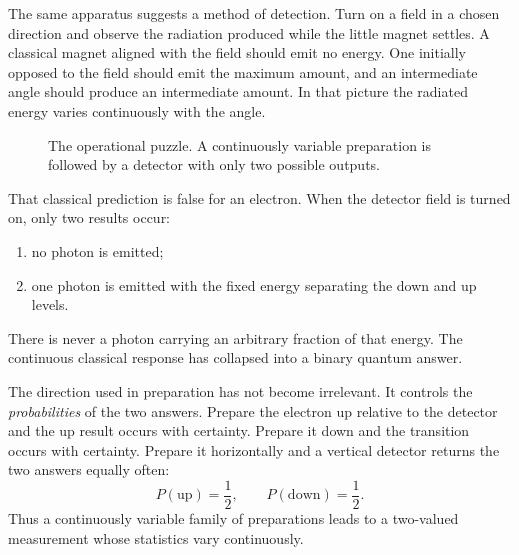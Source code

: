 The same apparatus suggests a method of detection. Turn on a field in a chosen direction and observe the radiation produced while the little magnet settles. A classical magnet aligned with the field should emit no energy. One initially opposed to the field should emit the maximum amount, and an intermediate angle should produce an intermediate amount. In that picture the radiated energy varies continuously with the angle.

\begin{figure}[htbp]
\centering
\begin{coursefitfigure}
\end{coursefitfigure}
\caption{The operational puzzle. A continuously variable preparation is followed by a detector with only two possible outputs.}
\end{figure}

That classical prediction is false for an electron. When the detector field is turned on, only two results occur:
\begin{enumerate}
  \item no photon is emitted;
  \item one photon is emitted with the fixed energy separating the down and up levels.
\end{enumerate}
There is never a photon carrying an arbitrary fraction of that energy. The continuous classical response has collapsed into a binary quantum answer.

The direction used in preparation has not become irrelevant. It controls the \emph{probabilities} of the two answers. Prepare the electron up relative to the detector and the up result occurs with certainty. Prepare it down and the transition occurs with certainty. Prepare it horizontally and a vertical detector returns the two answers equally often:
\begin{equation}
  P(\text{up})=\frac12,
  \qquad
  P(\text{down})=\frac12.
  \label{eq:l02-horizontal-probabilities}
\end{equation}
Thus a continuously variable family of preparations leads to a two-valued measurement whose statistics vary continuously.

